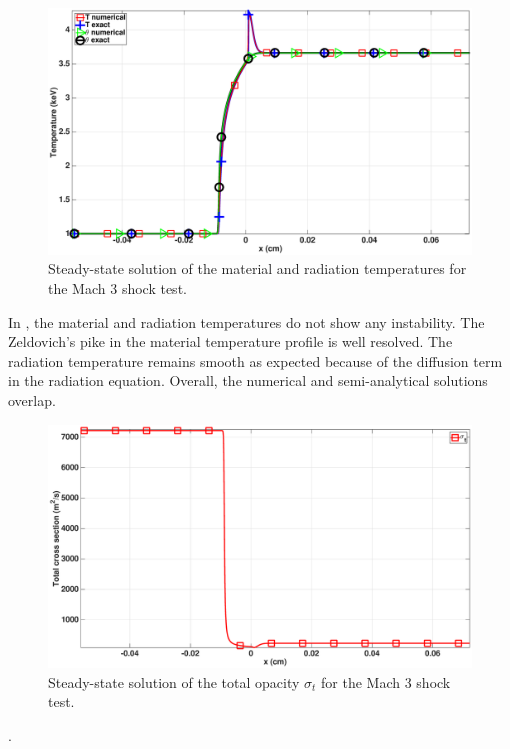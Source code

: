 \documentclass[times]{fldauth}
\begin{document}
%
\begin{figure}[H]
    \centering
    \includegraphics[width=\textwidth]{figures/dpt-xs/mach_3_nel_1000_temperature.eps}
    \caption{Steady-state solution of the material and radiation temperatures for the Mach 3 shock test.}\label{fig:mach-3-dpt-xs-temp}
\end{figure}
%
In , the material and radiation temperatures do not show any instability. The Zeldovich's pike in the material temperature profile is well resolved. The radiation temperature remains smooth as expected because of the diffusion term in the radiation equation. Overall, the numerical and semi-analytical solutions overlap. 
%
\begin{figure}[H]
    \centering
    \includegraphics[width=\textwidth]{figures/dpt-xs/mach_3_nel_1000_total_cross_section.eps}
    \caption{Steady-state solution of the total opacity $\sigma_t$ for the Mach 3 shock test.}\label{fig:mach-3-dpt-xs-xs}
\end{figure}
%
. \\ 
\end{document}
